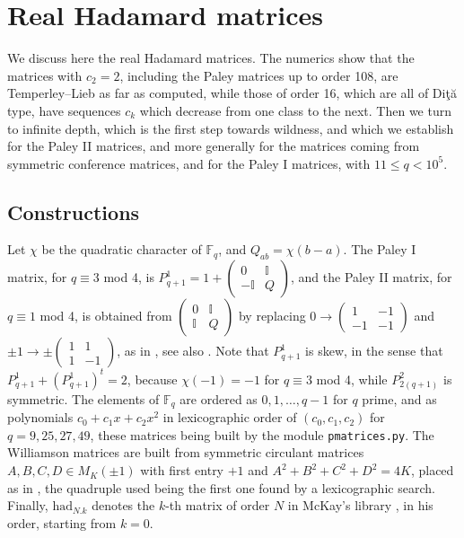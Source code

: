 \documentclass[11pt]{amsart}
\begin{document}
\section{Real Hadamard matrices}\label{sec:real}

We discuss here the real Hadamard matrices. The numerics show that the matrices with $c_2=2$, including the Paley matrices up to order 108, are Temperley--Lieb as far as computed, while those of order 16, which are all of Di\c t\u a type, have sequences $c_k$ which decrease from one class to the next. Then we turn to infinite depth, which is the first step towards wildness, and which we establish for the Paley II matrices, and more generally for the matrices coming from symmetric conference matrices, and for the Paley I matrices, with $11\leq q<10^5$.

\subsection{Constructions}

Let $\chi$ be the quadratic character of $\mathbb F_q$, and $Q_{ab}=\chi(b-a)$. The Paley I matrix, for $q\equiv3$ mod 4, is $P^1_{q+1}=1+\begin{pmatrix}0&\mathbb I\\-\mathbb I&Q\end{pmatrix}$, and the Paley II matrix, for $q\equiv1$ mod 4, is obtained from $\begin{pmatrix}0&\mathbb I\\ \mathbb I&Q\end{pmatrix}$ by replacing $0\to\begin{pmatrix}1&-1\\-1&-1\end{pmatrix}$ and $\pm1\to\pm\begin{pmatrix}1&1\\1&-1\end{pmatrix}$, as in \cite[Theorem 1.19]{banicaHM}, see also \cite{pal}. Note that $P^1_{q+1}$ is skew, in the sense that $P^1_{q+1}+(P^1_{q+1})^t=2$, because $\chi(-1)=-1$ for $q\equiv3$ mod 4, while $P^2_{2(q+1)}$ is symmetric. The elements of $\mathbb F_q$ are ordered as $0,1,\ldots,q-1$ for $q$ prime, and as polynomials $c_0+c_1x+c_2x^2$ in lexicographic order of $(c_0,c_1,c_2)$ for $q=9,25,27,49$, these matrices being built by the module \texttt{pmatrices.py}. The Williamson matrices are built from symmetric circulant matrices $A,B,C,D\in M_K(\pm1)$ with first entry $+1$ and $A^2+B^2+C^2+D^2=4K$, placed as in \cite[Theorem 1.24]{banicaHM}, the quadruple used being the first one found by a lexicographic search. Finally, $\mathrm{had}_{N.k}$ denotes the $k$-th matrix of order $N$ in McKay's library \cite{mck}, in his order, starting from $k=0$.
\end{document}
